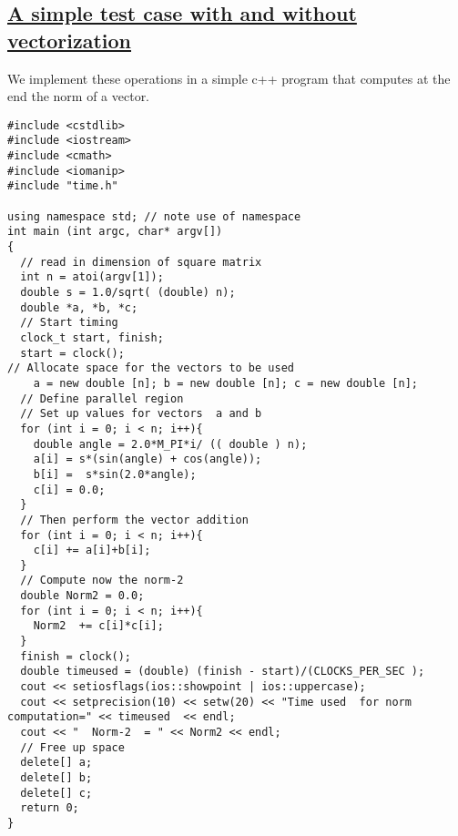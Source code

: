 \documentclass[%
oneside,                 %
final,                   %
10pt]{article}
\begin{document}
\noindent
\subsection*{\href{{https://github.com/CompPhysics/ComputationalPhysicsMSU/blob/master/doc/Programs/LecturePrograms/programs/Classes/cpp/program7.cpp}}{A simple test case with and without vectorization}}
We implement these operations in a simple c++ program that computes at the end the norm of a vector.




















































\begin{Verbatim}[numbers=none,fontsize=\fontsize{9pt}{9pt},baselinestretch=0.95]
#include <cstdlib>
#include <iostream>
#include <cmath>
#include <iomanip>
#include "time.h"

using namespace std; // note use of namespace
int main (int argc, char* argv[])
{
  // read in dimension of square matrix
  int n = atoi(argv[1]);
  double s = 1.0/sqrt( (double) n);
  double *a, *b, *c;
  // Start timing
  clock_t start, finish;
  start = clock();
// Allocate space for the vectors to be used
    a = new double [n]; b = new double [n]; c = new double [n];
  // Define parallel region
  // Set up values for vectors  a and b
  for (int i = 0; i < n; i++){
    double angle = 2.0*M_PI*i/ (( double ) n);
    a[i] = s*(sin(angle) + cos(angle));
    b[i] =  s*sin(2.0*angle);
    c[i] = 0.0;
  }
  // Then perform the vector addition
  for (int i = 0; i < n; i++){
    c[i] += a[i]+b[i];
  }
  // Compute now the norm-2
  double Norm2 = 0.0;
  for (int i = 0; i < n; i++){
    Norm2  += c[i]*c[i];
  }
  finish = clock();
  double timeused = (double) (finish - start)/(CLOCKS_PER_SEC );
  cout << setiosflags(ios::showpoint | ios::uppercase);
  cout << setprecision(10) << setw(20) << "Time used  for norm computation=" << timeused  << endl;
  cout << "  Norm-2  = " << Norm2 << endl;
  // Free up space
  delete[] a;
  delete[] b;
  delete[] c;
  return 0;
}





\end{Verbatim}
\end{document}
